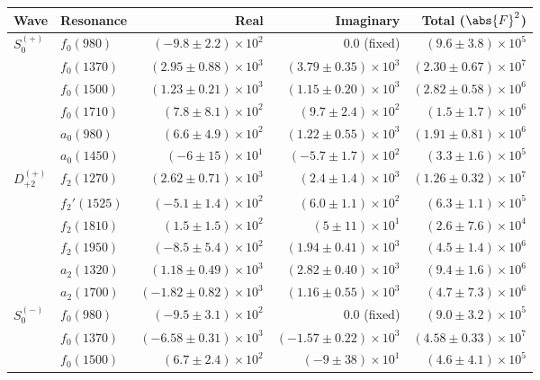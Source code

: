 \begin{table}[ht]
    \begin{center}
        \begin{tabular}{llrrr}\toprule
        Wave & Resonance & Real & Imaginary & Total ($\abs{F}^2$) \\\midrule
$S_{0}^{(+)}$ & $f_{0}(980)$ & $(-9.8 \pm 2.2) \times 10^{2}$ & $0.0$ (fixed) & $(9.6 \pm 3.8) \times 10^{5}$ \\
 & $f_{0}(1370)$ & $(2.95 \pm 0.88) \times 10^{3}$ & $(3.79 \pm 0.35) \times 10^{3}$ & $(2.30 \pm 0.67) \times 10^{7}$ \\
 & $f_{0}(1500)$ & $(1.23 \pm 0.21) \times 10^{3}$ & $(1.15 \pm 0.20) \times 10^{3}$ & $(2.82 \pm 0.58) \times 10^{6}$ \\
 & $f_{0}(1710)$ & $(7.8 \pm 8.1) \times 10^{2}$ & $(9.7 \pm 2.4) \times 10^{2}$ & $(1.5 \pm 1.7) \times 10^{6}$ \\
 & $a_{0}(980)$ & $(6.6 \pm 4.9) \times 10^{2}$ & $(1.22 \pm 0.55) \times 10^{3}$ & $(1.91 \pm 0.81) \times 10^{6}$ \\
 & $a_{0}(1450)$ & $(-6 \pm 15) \times 10^{1}$ & $(-5.7 \pm 1.7) \times 10^{2}$ & $(3.3 \pm 1.6) \times 10^{5}$ \\
$D_{+2}^{(+)}$ & $f_{2}(1270)$ & $(2.62 \pm 0.71) \times 10^{3}$ & $(2.4 \pm 1.4) \times 10^{3}$ & $(1.26 \pm 0.32) \times 10^{7}$ \\
 & $f_{2}'(1525)$ & $(-5.1 \pm 1.4) \times 10^{2}$ & $(6.0 \pm 1.1) \times 10^{2}$ & $(6.3 \pm 1.1) \times 10^{5}$ \\
 & $f_{2}(1810)$ & $(1.5 \pm 1.5) \times 10^{2}$ & $(5 \pm 11) \times 10^{1}$ & $(2.6 \pm 7.6) \times 10^{4}$ \\
 & $f_{2}(1950)$ & $(-8.5 \pm 5.4) \times 10^{2}$ & $(1.94 \pm 0.41) \times 10^{3}$ & $(4.5 \pm 1.4) \times 10^{6}$ \\
 & $a_{2}(1320)$ & $(1.18 \pm 0.49) \times 10^{3}$ & $(2.82 \pm 0.40) \times 10^{3}$ & $(9.4 \pm 1.6) \times 10^{6}$ \\
 & $a_{2}(1700)$ & $(-1.82 \pm 0.82) \times 10^{3}$ & $(1.16 \pm 0.55) \times 10^{3}$ & $(4.7 \pm 7.3) \times 10^{6}$ \\
$S_{0}^{(-)}$ & $f_{0}(980)$ & $(-9.5 \pm 3.1) \times 10^{2}$ & $0.0$ (fixed) & $(9.0 \pm 3.2) \times 10^{5}$ \\
 & $f_{0}(1370)$ & $(-6.58 \pm 0.31) \times 10^{3}$ & $(-1.57 \pm 0.22) \times 10^{3}$ & $(4.58 \pm 0.33) \times 10^{7}$ \\
 & $f_{0}(1500)$ & $(6.7 \pm 2.4) \times 10^{2}$ & $(-9 \pm 38) \times 10^{1}$ & $(4.6 \pm 4.1) \times 10^{5}$ \\

\end{tabular}
\end{center}
\end{table}
